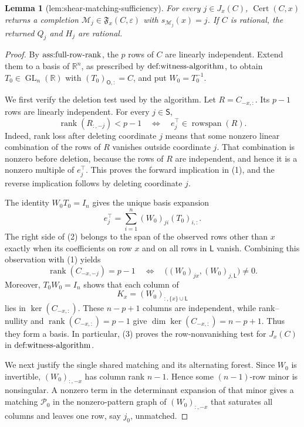\documentclass{article}
\newtheorem{lemma}{Lemma}
\begin{document}
\begin{lemma}[lem:shear-matching-sufficiency]\label{lem:shear-matching-sufficiency}
For every \(j\in J_x(C)\), \(\operatorname{Cert}(C,x)\) returns a completion \(\mathcal M_j\in\mathfrak F_x(C,\varepsilon)\) with \(s_{\mathcal M_j}(x)=j\). If \(C\) is rational, the returned \(Q_j\) and \(H_j\) are rational.
\end{lemma}
\begin{proof}
By \(\textnormal{ass:full-row-rank}\), the \(p\) rows of \(C\) are linearly independent.  Extend them to a basis of \(\mathbb R^n\), as prescribed by \(\textnormal{def:witness-algorithm}\), to obtain \(T_0\in\operatorname{GL}_n(\mathbb R)\) with \((T_0)_{\mathsf O,:}=C\), and put \(W_0=T_0^{-1}\).

We first verify the deletion test used by the algorithm.  Let \(R=C_{-x,:}\).  Its \(p-1\) rows are linearly independent.  For every \(j\in\mathsf S\),
\[
 \operatorname{rank}(R_{:,-j})<p-1
 \quad\Longleftrightarrow\quad
 e_j^\top\in\operatorname{rowspan}(R).                                      \tag{1}
\]
Indeed, rank loss after deleting coordinate \(j\) means that some nonzero linear combination of the rows of \(R\) vanishes outside coordinate \(j\).  That combination is nonzero before deletion, because the rows of \(R\) are independent, and hence it is a nonzero multiple of \(e_j^\top\).  This proves the forward implication in (1), and the reverse implication follows by deleting coordinate \(j\).

The identity \(W_0T_0=I_n\) gives the unique basis expansion
\[
 e_j^\top=\sum_{i=1}^n (W_0)_{ji}(T_0)_{i,:}.                              \tag{2}
\]
The right side of (2) belongs to the span of the observed rows other than \(x\) exactly when its coefficients on row \(x\) and on all rows in \(\mathsf L\) vanish.  Combining this observation with (1) yields
\[
 \operatorname{rank}(C_{-x,-j})=p-1
 \quad\Longleftrightarrow\quad
 \bigl((W_0)_{jx},(W_0)_{j,\mathsf L}\bigr)\ne0.                            \tag{3}
\]
Moreover, \(T_0W_0=I_n\) shows that each column of
\[
 K_x=(W_0)_{:,\{x\}\cup\mathsf L}
\]
lies in \(\ker(C_{-x,:})\).  These \(n-p+1\) columns are independent, while rank--nullity and \(\operatorname{rank}(C_{-x,:})=p-1\) give
\(\dim\ker(C_{-x,:})=n-p+1\).  Thus they form a basis.  In particular, (3) proves the row-nonvanishing test for \(J_x(C)\) in \(\textnormal{def:witness-algorithm}\).

We next justify the single shared matching and its alternating forest.  Since \(W_0\) is invertible, \((W_0)_{:,-x}\) has column rank \(n-1\).  Hence some \((n-1)\)-row minor is nonsingular.  A nonzero term in the determinant expansion of that minor gives a matching \(\mathcal P_0\) in the nonzero-pattern graph of \((W_0)_{:,-x}\) that saturates all columns and leaves one row, say \(j_0\), unmatched.


\end{proof}
\end{document}
